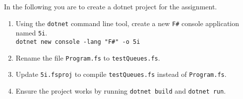 In the following you are to create a dotnet project for the assignment.
\begin{enumerate}
\item Using the \texttt{dotnet} command line tool, create a new \texttt{F\#} console application named \texttt{5i}.\\
  \texttt{dotnet new console -lang "F\#" -o 5i}
\item Rename the file \texttt{Program.fs} to \texttt{testQueues.fs}.
\item Update \texttt{5i.fsproj} to compile \texttt{testQueues.fs} instead of \texttt{Program.fs}.
\item Ensure the project works by running \texttt{dotnet build} and \texttt{dotnet run}.
\end{enumerate}